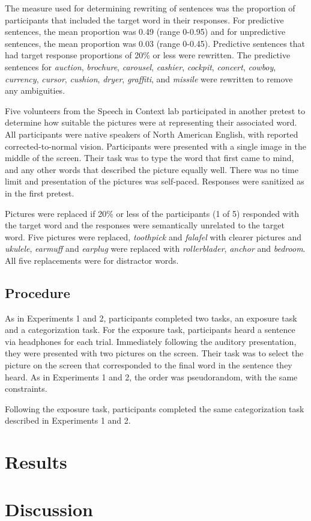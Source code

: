 The measure used for determining rewriting of sentences was the proportion of participants that included the target word in their responses.  For predictive sentences, the mean proportion was 0.49 (range 0-0.95) and for unpredictive sentences, the mean proportion was 0.03 (range 0-0.45).  Predictive sentences that had target response proportions of 20\% or less were rewritten.  The predictive sentences for \emph{auction}, \emph{brochure}, \emph{carousel}, \emph{cashier}, \emph{cockpit}, \emph{concert}, \emph{cowboy}, \emph{currency}, \emph{cursor}, \emph{cushion}, \emph{dryer}, \emph{graffiti}, and \emph{missile} were rewritten to remove any ambiguities.  

Five volunteers from the Speech in Context lab participated in another pretest to determine how suitable the pictures were at representing their associated word.  All participants were native speakers of North American English, with reported corrected-to-normal vision. Participants were presented with a single image in the middle of the screen.  Their task was to type the word that first came to mind, and any other words that described the picture equally well.  There was no time limit and presentation of the pictures was self-paced. Responses were sanitized as in the first pretest.  

Pictures were replaced if 20\% or less of the participants (1 of 5) responded with the target word and the responses were semantically unrelated to the target word. Five pictures were replaced, \emph{toothpick} and \emph{falafel} with clearer pictures and \emph{ukulele}, \emph{earmuff} and \emph{earplug} were replaced with \emph{rollerblader}, \emph{anchor} and \emph{bedroom}.  All five replacements were for distractor words.

\subsection{Procedure}

As in Experiments 1 and 2, participants completed two tasks, an exposure task and a categorization task.  For the exposure task, participants heard a sentence via headphones for each trial.  Immediately following the auditory presentation, they were presented with two pictures on the screen.  Their task was to select the picture on the screen that corresponded to the final word in the sentence they heard.  As in Experiments 1 and 2, the order was pseudorandom, with the same constraints.

Following the exposure task, participants completed the same categorization task described in Experiments 1 and 2.

\section{Results}

\section{Discussion}
